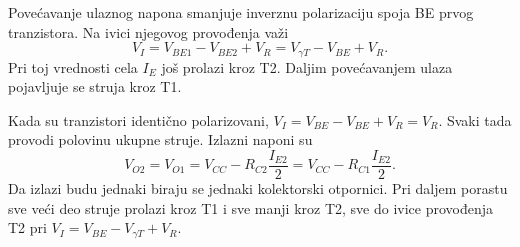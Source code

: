 Povećavanje ulaznog napona smanjuje inverznu polarizaciju spoja BE prvog tranzistora. Na ivici njegovog provođenja važi
\[V_I=V_{BE1}-V_{BE2}+V_R=V_{\gamma T}-V_{BE}+V_R.\]
Pri toj vrednosti cela $I_E$ još prolazi kroz T2. Daljim povećavanjem ulaza pojavljuje se struja kroz T1.

Kada su tranzistori identično polarizovani, $V_I=V_{BE}-V_{BE}+V_R=V_R$. Svaki tada provodi polovinu ukupne struje. Izlazni naponi su
\[V_{O2}=V_{O1}=V_{CC}-R_{C2}\frac{I_{E2}}2=V_{CC}-R_{C1}\frac{I_{E2}}2.\]
Da izlazi budu jednaki biraju se jednaki kolektorski otpornici. Pri daljem porastu sve veći deo struje prolazi kroz T1 i sve manji kroz T2, sve do ivice provođenja T2 pri $V_I=V_{BE}-V_{\gamma T}+V_R$.
